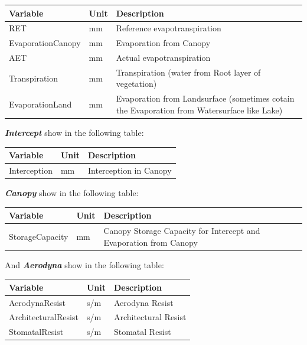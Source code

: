 \documentclass[
]{book}
\begin{document}
\begin{table}[!h]
\centering
\begin{tabular}{l|l|l}
\hline
Variable & Unit & Description\\
\hline
RET & mm & Reference evapotranspiration\\
\cline{1-3}
EvaporationCanopy & mm & Evaporation from Canopy\\
\cline{1-3}
AET & mm & Actual evapotranspiration\\
\cline{1-3}
Transpiration & mm & Transpiration (water from Root layer of vegetation)\\
\cline{1-3}
EvaporationLand & mm & Evaporation from Landsurface (sometimes cotain the Evaporation from Watersurface like Lake)\\
\hline
\end{tabular}
\end{table}

\textbf{\emph{Intercept}} show in the following table:

\begin{table}[!h]
\centering
\begin{tabular}{l|l|l}
\hline
Variable & Unit & Description\\
\hline
Interception & mm & Interception in Canopy\\
\hline
\end{tabular}
\end{table}

\textbf{\emph{Canopy}} show in the following table:

\begin{table}[!h]
\centering
\begin{tabular}{l|l|l}
\hline
Variable & Unit & Description\\
\hline
StorageCapacity & mm & Canopy Storage Capacity for Intercept and Evaporation from Canopy\\
\hline
\end{tabular}
\end{table}

And \textbf{\emph{Aerodyna}} show in the following table:

\begin{table}[!h]
\centering
\begin{tabular}{l|l|l}
\hline
Variable & Unit & Description\\
\hline
AerodynaResist & s/m & Aerodyna Resist\\
\cline{1-3}
ArchitecturalResist & s/m & Architectural Resist\\
\cline{1-3}
StomatalResist & s/m & Stomatal Resist\\
\hline
\end{tabular}
\end{table}
\end{document}
